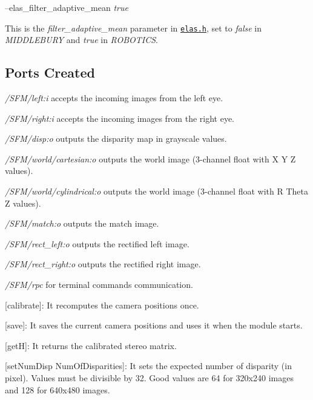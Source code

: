 --elas\+\_\+filter\+\_\+adaptive\+\_\+mean {\itshape true} 
\begin{DoxyItemize}
\item This is the {\itshape filter\+\_\+adaptive\+\_\+mean} parameter in \href{https://github.com/robotology/stereo-vision/tree/master/lib/elas/include/elas.h}{\tt elas.\+h}, set to {\itshape false} in {\itshape M\+I\+D\+D\+L\+E\+B\+U\+RY} and {\itshape true} in {\itshape R\+O\+B\+O\+T\+I\+CS}.
\end{DoxyItemize}\hypertarget{group__SFM_portsc_sec}{}\subsection{Ports Created}\label{group__SFM_portsc_sec}

\begin{DoxyItemize}
\item {\itshape  /\+S\+F\+M/left\+:i } accepts the incoming images from the left eye.
\item {\itshape  /\+S\+F\+M/right\+:i } accepts the incoming images from the right eye.
\item {\itshape  /\+S\+F\+M/disp\+:o } outputs the disparity map in grayscale values.
\item {\itshape  /\+S\+F\+M/world/cartesian\+:o} outputs the world image (3-\/channel float with X Y Z values).
\item {\itshape  /\+S\+F\+M/world/cylindrical\+:o} outputs the world image (3-\/channel float with R Theta Z values).
\item {\itshape  /\+S\+F\+M/match\+:o} outputs the match image.
\item {\itshape  /\+S\+F\+M/rect\+\_\+left\+:o} outputs the rectified left image.
\item {\itshape  /\+S\+F\+M/rect\+\_\+right\+:o} outputs the rectified right image.
\item {\itshape  /\+S\+F\+M/rpc } for terminal commands communication.
\begin{DoxyItemize}
\item \mbox{[}calibrate\mbox{]}\+: It recomputes the camera positions once.
\item \mbox{[}save\mbox{]}\+: It saves the current camera positions and uses it when the module starts.
\item \mbox{[}getH\mbox{]}\+: It returns the calibrated stereo matrix.
\item \mbox{[}set\+Num\+Disp Num\+Of\+Disparities\mbox{]}\+: It sets the expected number of disparity (in pixel). Values must be divisible by 32. Good values are 64 for 320x240 images and 128 for 640x480 images.

\end{DoxyItemize}
\end{DoxyItemize}
